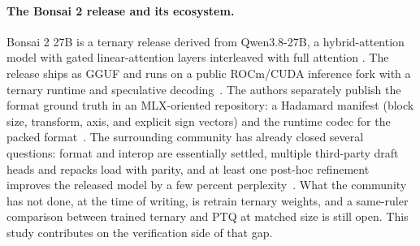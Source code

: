 \paragraph{The Bonsai 2 release and its ecosystem.}
Bonsai 2 27B is a ternary release derived from Qwen3.8-27B, a hybrid-attention
model with gated linear-attention layers interleaved with full attention
\citep{qwen38,qwen3}. The release ships as GGUF and runs on a public
ROCm/CUDA inference fork with a ternary runtime and speculative
decoding~\citep{prismfork,llamacpp,gguf}. The authors separately publish the
format ground truth in an MLX-oriented repository: a Hadamard manifest
(block size, transform, axis, and explicit sign vectors) and the runtime codec
for the packed format~\citep{prismbonsai2mlx}. The surrounding community has
already closed several questions: format and interop are essentially settled,
multiple third-party draft heads and repacks load with parity, and at least one
post-hoc refinement improves the released model by a few percent
perplexity~\citep{gsqrco,mtp,jang}. What the community has not done, at the
time of writing, is retrain ternary weights, and a same-ruler comparison
between trained ternary and PTQ at matched size is still open. This study
contributes on the verification side of that gap.
